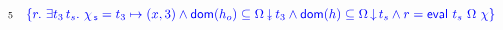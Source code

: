 \documentclass[a4paper,UKenglish]{lipics-v2016}
\newcommand{\dom}[1]{\mathsf{dom}(#1)}
\newcommand{\specK}[1]{\ensuremath{\textcolor{blue}{#1}}}
\newcommand{\selfsub}{\mathsf{s}}
\newcommand{\othersub}{\mathsf{o}}
\newcommand{\hist}{\chi}
\newcommand{\histS}{\hist_{\, \selfsub}}
\newcommand{\hpts}{\mapsto}
\newcommand{\ldot}{\mathord{.}\,}
\newcommand{\stableorder}{\Omega}
\newcommand{\num}[1]{{\text{{\scriptsize{#1}}}}}
\theoremstyle{definition}
\begin{document}
{\[\begin{array}{l c}
  \num{5} & \hfill {\specK{\{ r\ldot\, \exists t_3\, t_s\ldot\,
    \histS = t_3 \hpts (x,3) \wedge
    \dom{h_o} \subseteq \sideal{\stableorder}{t_3} \wedge 
    \dom{h} \subseteq \ideal{\stableorder}{t_s} \wedge
    r = \eval\ t_s\ \stableorder\ \hist\}}} \hfill
\end{array}
\]}
\end{document}
